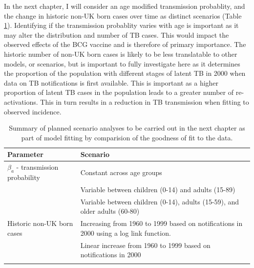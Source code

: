 \documentclass[11pt,twoside]{bristolthesis}
\begin{document}
  In the next chapter, I will consider an age modified transmission probablity, and the change in historic non-UK born cases over time as distinct scenarios (Table \ref{tab:summary-scenarios}). Identifying if the transmission probablity varies with age is important as it may alter the distribution and number of TB cases. This would impact the observed effects of the BCG vaccine and is therefore of primary importance. The historic number of non-UK born cases is likely to be less translatable to other models, or scenarios, but is important to fully investigate here as it determines the proportion of the population with different stages of latent TB in 2000 when data on TB notifications is first available. This is important as a higher proportion of latent TB cases in the population leads to a greater number of re-activations. This in turn results in a reduction in TB transmission when fitting to observed incidence.
  \begin{table}[t]
  
  \caption{\label{tab:summary-scenarios}Summary of planned scenario analyses to be carried out in the next chapter as part of model fitting by comparision of the goodness of fit to the data.}
  \centering
  \begin{tabular}{>{\raggedright\arraybackslash}p{2cm}>{\raggedright\arraybackslash}p{8cm}}
  \toprule
  Parameter & Scenario\\
  \midrule
  $\beta_a$ - transmission probability & Constant across age groups\\
   & Variable between children (0-14) and adults (15-89)\\
   & Variable between children (0-14), adults (15-59), and older adults (60-80)\\
  Historic non-UK born cases & Increasing from 1960 to 1999 based on notifications in 2000 using a log link function.\\
   & Linear increase from 1960 to 1999 based on notifications in 2000\\
  \addlinespace
   & \\
  \bottomrule
  \end{tabular}
  \end{table}
\end{document}
